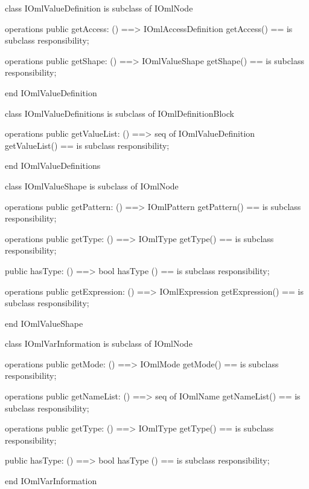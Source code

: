 \begin{vdm_al}
class IOmlValueDefinition
 is subclass of IOmlNode

operations
  public getAccess: () ==> IOmlAccessDefinition
  getAccess() == is subclass responsibility;

operations
  public getShape: () ==> IOmlValueShape
  getShape() == is subclass responsibility;

end IOmlValueDefinition
\end{vdm_al}

\begin{vdm_al}
class IOmlValueDefinitions
 is subclass of IOmlDefinitionBlock

operations
  public getValueList: () ==> seq of IOmlValueDefinition
  getValueList() == is subclass responsibility;

end IOmlValueDefinitions
\end{vdm_al}

\begin{vdm_al}
class IOmlValueShape
 is subclass of IOmlNode

operations
  public getPattern: () ==> IOmlPattern
  getPattern() == is subclass responsibility;

operations
  public getType: () ==> IOmlType
  getType() == is subclass responsibility;

  public hasType: () ==> bool
  hasType () == is subclass responsibility;

operations
  public getExpression: () ==> IOmlExpression
  getExpression() == is subclass responsibility;

end IOmlValueShape
\end{vdm_al}

\begin{vdm_al}
class IOmlVarInformation
 is subclass of IOmlNode

operations
  public getMode: () ==> IOmlMode
  getMode() == is subclass responsibility;

operations
  public getNameList: () ==> seq of IOmlName
  getNameList() == is subclass responsibility;

operations
  public getType: () ==> IOmlType
  getType() == is subclass responsibility;

  public hasType: () ==> bool
  hasType () == is subclass responsibility;

end IOmlVarInformation
\end{vdm_al}


